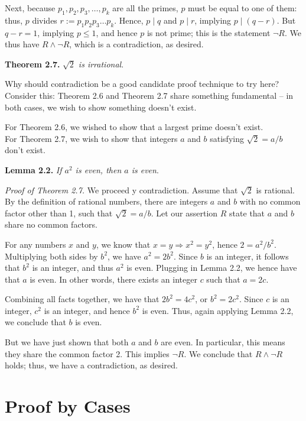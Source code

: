 \documentclass[12pt,a4paper]{article}
\begin{document}
\bigbreak

Next, because $p_1,p_2,p_3,\dots,p_k$ are all the primes, $p$ must be equal to one of them: thus, $p$ divides $r:=p_1p_2p_3\dots p_k$. Hence, $p\mid q$ and $p\mid r$, implying $p\mid(q-r)$. But $q-r=1$, implying $p\leq 1$, and hence $p$ is not prime; this is the statement $\neg R$. We thus have $R\wedge\neg R$, which is a contradiction, as desired.

\bigbreak

\textbf{Theorem 2.7.} \textit{$\sqrt{2}$ is irrational}.

\bigbreak

Why should contradiction be a good candidate proof technique to try here? Consider this: Theorem 2.6 and Theorem 2.7 share something fundamental -- in both cases, we wish to show something doesn't exist.

\bigbreak

For Theorem 2.6, we wished to show that a largest prime doesn't exist. \\
For Theorem 2.7, we wish to show that integers $a$ and $b$ satisfying $\sqrt{2}=a/b$ don't exist.

\bigbreak

\textbf{Lemma 2.2.} \textit{If $a^2$ is even, then $a$ is even}.

\bigbreak

\textit{Proof of Theorem 2.7.} We proceed y contradiction. Assume that $\sqrt{2}$ is rational. By the definition of rational numbers, there are integers $a$ and $b$ with no common factor other than 1, such that $\sqrt{2}=a/b$. Let our assertion $R$ state that $a$ and $b$ share no common factors.

\bigbreak

For any numbers $x$ and $y$, we know that $x=y\Rightarrow x^2=y^2$, hence $2=a^2/b^2$. Multiplying both sides by $b^2$, we have $a^2=2b^2$. Since $b$ is an integer, it follows that $b^2$ is an integer, and thus $a^2$ is even. Plugging in Lemma 2.2, we hence have that $a$ is even. In other words, there exists an integer $c$ such that $a=2c$.

\bigbreak

Combining all facts together, we have that $2b^2=4c^2$, or $b^2=2c^2$. Since $c$ is an integer, $c^2$ is an integer, and hence $b^2$ is even. Thus, again applying Lemma 2.2, we conclude that $b$ is even.

\bigbreak

But we have just shown that both $a$ and $b$ are even. In particular, this means they share the common factor 2. This implies $\neg R$. We conclude that $R\wedge\neg R$ holds; thus, we have a contradiction, as desired.

\newpage

\section*{Proof by Cases} 
\end{document}
